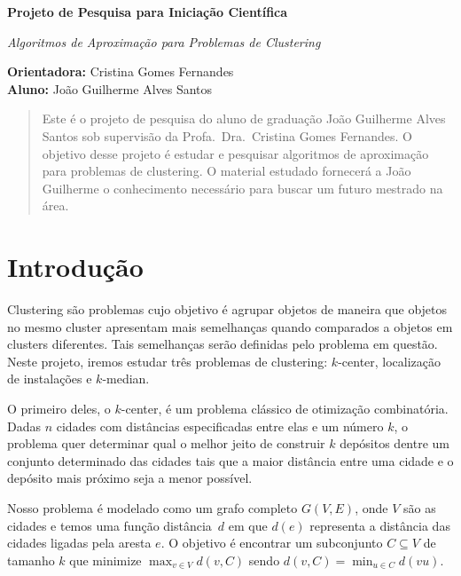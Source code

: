 \documentclass[12pt]{article}
\begin{document}
\begin{center}
  
{\Large {\bf Projeto de Pesquisa para Iniciação Científica}

{\large {\em Algoritmos de Aproximação para Problemas de Clustering}} 

}

\vspace{0.2cm}
{\small 
{\bf Orientadora:} Cristina Gomes Fernandes \\
{\bf Aluno:} João Guilherme Alves Santos
}

\vspace{5mm} 

\begin{abstract}
Este é o projeto de pesquisa do aluno de graduação João Guilherme Alves Santos sob supervisão da Profa.\ Dra.\ Cristina Gomes Fernandes. O objetivo desse projeto é estudar e pesquisar algoritmos de aproximação para problemas de clustering. O material estudado fornecerá a João Guilherme o conhecimento necessário para buscar um futuro mestrado na área.
\end{abstract}

\end{center}

\section{Introdução}

Clustering são problemas cujo objetivo é agrupar objetos de maneira que objetos no mesmo cluster apresentam mais semelhanças quando comparados a objetos em clusters diferentes. Tais semelhanças serão definidas pelo problema em questão. Neste projeto, iremos estudar três problemas de clustering: $k$-center, localização de instalações e $k$-median. 


O primeiro deles, o $k$-center, é um problema clássico de otimização combinatória. Dadas $n$ cidades com distâncias especificadas entre elas e um número $k$, o problema quer determinar qual o melhor jeito de construir $k$ depósitos dentre um conjunto determinado das cidades tais que a maior distância entre uma cidade e o depósito mais próximo seja a menor possível.

Nosso problema é modelado como um grafo completo $G(V,E)$, onde $V$ são as cidades e temos uma função distância~$d$ em que $d(e)$ representa a distância das cidades ligadas pela aresta $e$. O objetivo é encontrar um subconjunto $C \subseteq V$ de tamanho $k$ que minimize $\max_{v\in V}d(v,C)$ sendo $d(v,C) = \min_{u\in C}d(vu)$.
\end{document}
